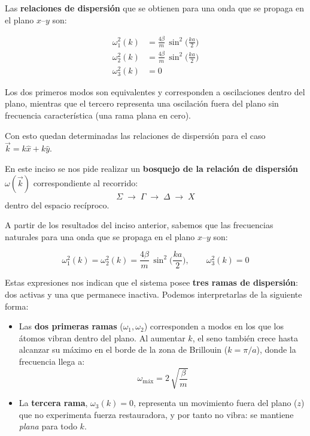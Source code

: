 \documentclass{article}
\begin{document}
Las \textbf{relaciones de dispersión} que se obtienen para una onda que se propaga en el plano \(x\text{–}y\) son:

\begin{equation}
\boxed{
\begin{aligned}
\omega^2_1(k) &= \frac{4\beta}{m}\,\sin^2\!\Big(\tfrac{ka}{2}\Big)\\[4pt]
\omega^2_2(k) &= \frac{4\beta}{m}\,\sin^2\!\Big(\tfrac{ka}{2}\Big)\\[4pt]
\omega^2_3(k) &= 0
\end{aligned}}
\label{eq:d_dispersiones_finales}
\end{equation}

Los dos primeros modos son equivalentes y corresponden a oscilaciones dentro del plano, mientras que el tercero representa una oscilación fuera del plano sin frecuencia característica (una rama plana en cero).

\medskip
Con esto quedan determinadas las relaciones de dispersión para el caso \(\vec k = k\hat x + k\hat y\).


\;

En este inciso se nos pide realizar un \textbf{bosquejo de la relación de dispersión} \(\omega(\vec{k})\) 
correspondiente al recorrido:
\[
\Sigma \;\rightarrow\; \Gamma \;\rightarrow\; \Delta \;\rightarrow\; X
\]
dentro del espacio recíproco.

\medskip
A partir de los resultados del inciso anterior, sabemos que las frecuencias naturales para una onda que se propaga en el plano \(x\text{–}y\) son:

\[
\omega^2_1(k)=\omega^2_2(k)=\frac{4\beta}{m}\,\sin^2\!\Big(\frac{ka}{2}\Big),
\qquad
\omega^2_3(k)=0
\]

Estas expresiones nos indican que el sistema posee \textbf{tres ramas de dispersión}: dos activas y una que permanece inactiva.  
Podemos interpretarlas de la siguiente forma:

\begin{itemize}
  \item[$\bullet$] Las \textbf{dos primeras ramas} (\(\omega_1, \omega_2\)) corresponden a modos en los que los átomos vibran dentro del plano. Al aumentar \(k\), el seno también crece hasta alcanzar su máximo en el borde de la zona de Brillouin (\(k=\pi/a\)), donde la frecuencia llega a:
  \[
  \omega_{\text{máx}} = 2\,\sqrt{\frac{\beta}{m}}
  \]
  \item[$\bullet$] La \textbf{tercera rama}, \(\omega_3(k)=0\), representa un movimiento fuera del plano (\(z\)) que no experimenta fuerza restauradora, y por tanto no vibra: se mantiene \emph{plana} para todo \(k\).
\end{itemize}
\end{document}
